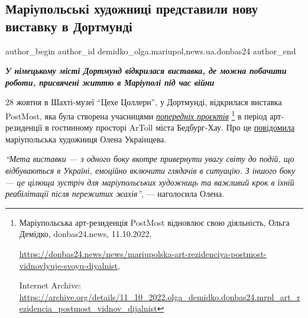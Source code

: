  
 
 
 
 
 
\subsection{Маріупольські художниці представили нову виставку в Дортмунді}
\label{sec:01_11_2022.stz.news.ua.donbas24.1.mrpl_hudozhnyci_nova_vystavka_dortmund}
 
\ifcmt
 author_begin
   author_id demidko_olga.mariupol,news.ua.donbas24
 author_end
\fi

\begin{center}
  \em\color{blue}\bfseries\Large
У німецькому місті Дортмунд відкрилася виставка, де можна побачити роботи,
присвячені життю в Маріуполі під час війни
\end{center}

28 жовтня в Шахті-музеї \enquote{Цехе Цоллерн}, у Дортмунді, відкрилася виставка
PostMost, яка була створена учасницями \href{https://archive.org/details/11_10_2022.olga_demidko.donbas24.mrpl_art_rezidencia_postmost_vidnov_dijalnist}{\emph{попередніх проєктів}}%
\footnote{Маріупольська арт-резиденція PostMost відновлює свою діяльність, Ольга Демідко, donbas24.news, 11.10.2022, %
\par\url{https://donbas24.news/news/mariupolska-art-rezidenciya-postmost-vidnovlyuje-svoyu-diyalnist}, \par%
Internet Archive: \url{https://archive.org/details/11_10_2022.olga_demidko.donbas24.mrpl_art_rezidencia_postmost_vidnov_dijalnist}%
} в період арт-резиденції в гостинному просторі ArToll міста Бедбург-Хау. Про це
\href{https://www.facebook.com/profile.php?id=100002254840110}{повідомила} маріупольська художниця Олена Украінцева.

\begin{leftbar}
\emph{\enquote{Мета виставки — з одного боку вкотре привернути увагу світу до подій, що
відбуваються в Україні, емоційно включити глядачів в ситуацію. З іншого
боку — це цілюща зустріч для маріупольських художниць та важливий крок
в їхній реабілітації після пережитих жахів}}, — наголосила Олена.
\end{leftbar}

